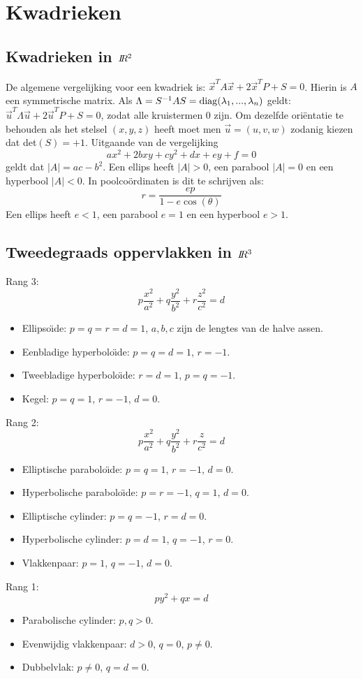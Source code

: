 \documentclass[twoside]{report}
\begin{document}
\section{Kwadrieken}
\subsection{Kwadrieken in $I\hspace{-1mm}R^2$}
De algemene vergelijking voor een kwadriek is:
$\vec{x}^TA\vec{x}+2\vec{x}^TP+S=0$. Hierin is $A$ een symmetrische matrix.
Als $\Lambda=S^{-1}AS={\rm diag}(\lambda_1,...,\lambda_n)$ geldt:
$\vec{u}^T\Lambda\vec{u}+2\vec{u}^TP+S=0$, zodat alle kruistermen 0 zijn.
Om dezelfde ori\"entatie te behouden als het stelsel $(x,y,z)$ heeft moet men
$\vec{u}=(u,v,w)$ zodanig kiezen dat det$(S)=+1$.
\npar
Uitgaande van de vergelijking
\[
ax^2+2bxy+cy^2+dx+ey+f=0
\]
geldt dat $|A|=ac-b^2$. Een ellips heeft $|A|>0$, een parabool $|A|=0$ en
een hyperbool $|A|<0$. In poolco\"ordinaten is dit te schrijven als:
\[
r=\frac{ep}{1-e\cos(\theta)}
\]
Een ellips heeft $e<1$, een parabool $e=1$ en een hyperbool $e>1$.

\subsection{Tweedegraads oppervlakken in $I\hspace{-1mm}R^3$}
Rang 3:
\[
p\frac{x^2}{a^2}+q\frac{y^2}{b^2}+r\frac{z^2}{c^2}=d
\]
\begin{itemize}
\item Ellipso\"{\i}de: $p=q=r=d=1$, $a,b,c$ zijn de lengtes van de halve assen.
\item Eenbladige hyperbolo\"{\i}de: $p=q=d=1$, $r=-1$.
\item Tweebladige hyperbolo\"{\i}de: $r=d=1$, $p=q=-1$.
\item Kegel: $p=q=1$, $r=-1$, $d=0$.
\end{itemize}
Rang 2:
\[
p\frac{x^2}{a^2}+q\frac{y^2}{b^2}+r\frac{z}{c^2}=d
\]
\begin{itemize}
\item Elliptische parabolo\"{\i}de: $p=q=1$, $r=-1$, $d=0$.
\item Hyperbolische parabolo\"{\i}de: $p=r=-1$, $q=1$, $d=0$.
\item Elliptische cylinder: $p=q=-1$, $r=d=0$.
\item Hyperbolische cylinder: $p=d=1$, $q=-1$, $r=0$.
\item Vlakkenpaar: $p=1$, $q=-1$, $d=0$.
\end{itemize}
Rang 1:
\[
py^2+qx=d
\]
\begin{itemize}
\item Parabolische cylinder: $p,q>0$.
\item Evenwijdig vlakkenpaar: $d>0$, $q=0$, $p\neq 0$.
\item Dubbelvlak: $p\neq 0$, $q=d=0$.
\end{itemize}
\end{document}
